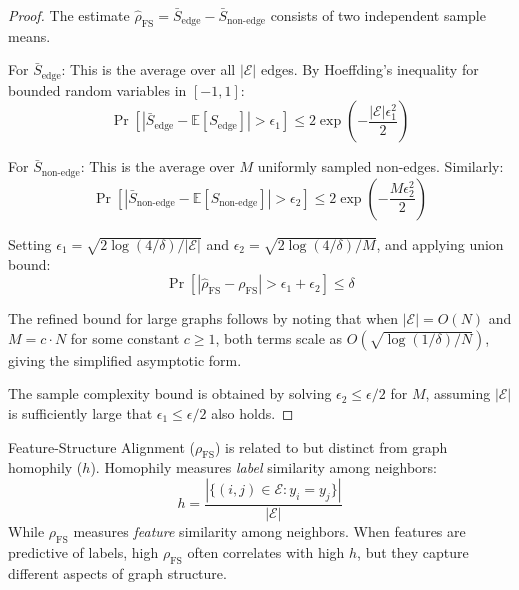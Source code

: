 \begin{proof}
The estimate $\hat{\rho}_{\text{FS}} = \bar{S}_{\text{edge}} - \bar{S}_{\text{non-edge}}$ consists of two independent sample means.

For $\bar{S}_{\text{edge}}$: This is the average over all $|\mathcal{E}|$ edges. By Hoeffding's inequality for bounded random variables in $[-1, 1]$:
\begin{equation}
\Pr\left[|\bar{S}_{\text{edge}} - \mathbb{E}[S_{\text{edge}}]| > \epsilon_1\right] \leq 2\exp\left(-\frac{|\mathcal{E}| \epsilon_1^2}{2}\right)
\end{equation}

For $\bar{S}_{\text{non-edge}}$: This is the average over $M$ uniformly sampled non-edges. Similarly:
\begin{equation}
\Pr\left[|\bar{S}_{\text{non-edge}} - \mathbb{E}[S_{\text{non-edge}}]| > \epsilon_2\right] \leq 2\exp\left(-\frac{M \epsilon_2^2}{2}\right)
\end{equation}

Setting $\epsilon_1 = \sqrt{2\log(4/\delta)/|\mathcal{E}|}$ and $\epsilon_2 = \sqrt{2\log(4/\delta)/M}$, and applying union bound:
\begin{equation}
\Pr\left[|\hat{\rho}_{\text{FS}} - \rho_{\text{FS}}| > \epsilon_1 + \epsilon_2\right] \leq \delta
\end{equation}

The refined bound for large graphs follows by noting that when $|\mathcal{E}| = O(N)$ and $M = c \cdot N$ for some constant $c \geq 1$, both terms scale as $O(\sqrt{\log(1/\delta)/N})$, giving the simplified asymptotic form.

The sample complexity bound is obtained by solving $\epsilon_2 \leq \epsilon/2$ for $M$, assuming $|\mathcal{E}|$ is sufficiently large that $\epsilon_1 \leq \epsilon/2$ also holds.
\end{proof}

\begin{remark}
Feature-Structure Alignment ($\rho_{\text{FS}}$) is related to but distinct from graph homophily ($h$). Homophily measures \textit{label} similarity among neighbors:
\begin{equation}
h = \frac{|\{(i,j) \in \mathcal{E} : y_i = y_j\}|}{|\mathcal{E}|}
\end{equation}
While $\rho_{\text{FS}}$ measures \textit{feature} similarity among neighbors. When features are predictive of labels, high $\rho_{\text{FS}}$ often correlates with high $h$, but they capture different aspects of graph structure.
\end{remark}

